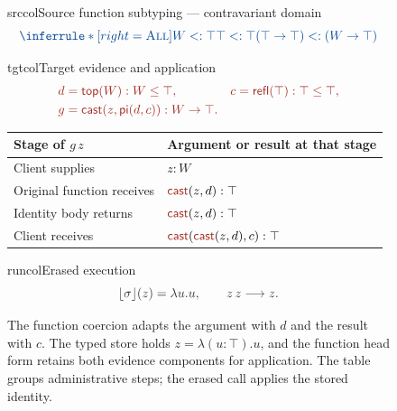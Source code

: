 \begin{figure}[!htbp]
\begin{examplepanel}{srccol}{Source function subtyping --- contravariant domain}
\[
\src{\inferrule*[right=\textsc{All}]{
 W<:\top\\ \top<:\top
}{(\top\to\top)<:(W\to\top)}}
\]
\end{examplepanel}
\begin{examplepanel}{tgtcol}{Target evidence and application}
\[
\tgt{\begin{aligned}
 d&=\ev{top}(W):W\le\top,&c&=\ev{refl}(\top):\top\le\top,\\
 g&=\cast{z}{\ev{pi}(d,c)}:W\to\top.
\end{aligned}}
\]
\par\small
\renewcommand{\arraystretch}{1.2}
\noindent\begin{tabularx}{\linewidth}{@{}lX@{}}
\toprule
Stage of \(g\,z\) & Argument or result at that stage\\
\midrule
Client supplies & $z:W$\\
Original function receives & $\cast{z}{d}:\top$\\
Identity body returns & $\cast{z}{d}:\top$\\
Client receives & $\cast{\cast{z}{d}}{c}:\top$\\
\bottomrule
\end{tabularx}\par
\end{examplepanel}
\begin{examplepanel}{runcol}{Erased execution}
\[
\run{\erase{\sigma}(z)=\lambda u.u,\qquad z\,z\longrightarrow z.}
\]
\end{examplepanel}
\caption{The function coercion adapts the argument with \(d\) and the
result with \(c\). The typed store holds \(z=\lambda(u:\top).u\), and
the function head form retains both evidence components for application.
The table groups administrative steps; the erased call applies the
stored identity.}
\label{fig:function-call}
\end{figure}
